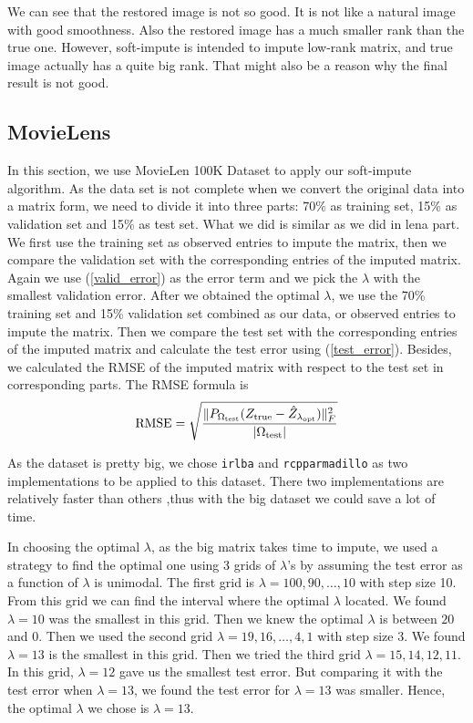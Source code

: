 \documentclass{article}
\begin{document}
	We can see that the restored image is not so good. It is not like a natural image with good smoothness. Also the restored image has a much smaller rank than the true one. However, soft-impute is intended to impute low-rank matrix, and true image actually has a quite big rank. That might also be a reason why the final result is not good.

	\subsection{MovieLens}

	In this section, we use MovieLen 100K Dataset to apply our soft-impute algorithm. As the data set is not complete when we convert the original data into a matrix form, we need to divide it into three parts: 70\% as training set, 15\% as validation set and 15\% as test set. What we did is similar as we did in lena part. We first use the training set as observed entries to impute the matrix, then we compare the validation set with the corresponding entries of the imputed matrix. Again we use (\ref{valid_error}) as the error term and we pick the $\lambda$ with the smallest validation error. After we obtained the optimal $\lambda$, we use the 70\% training set and 15\% validation set combined as our data, or observed entries to impute the matrix. Then we compare the test set with the corresponding entries of the imputed matrix and calculate the test error using (\ref{test_error}). Besides, we calculated the RMSE of the imputed matrix with respect to the test set in corresponding parts. The RMSE formula is
	\begin{equation}
	\textrm{RMSE} = \sqrt{\frac{\|P_{\Omega_{\rm test}}(Z_{\rm true} - \hat{Z}_{\lambda_{\rm opt}})\|_{F}^2}{|\Omega_{\rm test}|}}
	\end{equation}

	As the dataset is pretty big, we chose \verb|irlba| and \verb|rcpparmadillo| as two implementations to be applied to this dataset. There two implementations are relatively faster than others ,thus with the big dataset we could save a lot of time. 

	In choosing the optimal $\lambda$, as the big matrix takes time to impute, we used a strategy to find the optimal one using 3 grids of $\lambda$'s by assuming the test error as a function of $\lambda$ is unimodal. The first grid is $\lambda = 100, 90, \ldots, 10$ with step size 10. From this grid we can find the interval where the optimal $\lambda$ located. We found $\lambda  = 10$ was the smallest in this grid. Then we knew the optimal $\lambda$ is between $20$ and $0$. Then we used the second grid $\lambda = 19, 16, \ldots, 4, 1$ with step size 3. We found $\lambda = 13$ is the smallest in this grid. Then we tried the third grid $\lambda = 15, 14, 12, 11$. In this grid, $\lambda = 12$ gave us the smallest test error. But comparing it with the test error when $\lambda = 13$, we found the test error for $\lambda =13$ was smaller. Hence, the optimal $\lambda$ we chose is $\lambda = 13$. 





	

	\newpage

	
	

	
	
\end{document}
